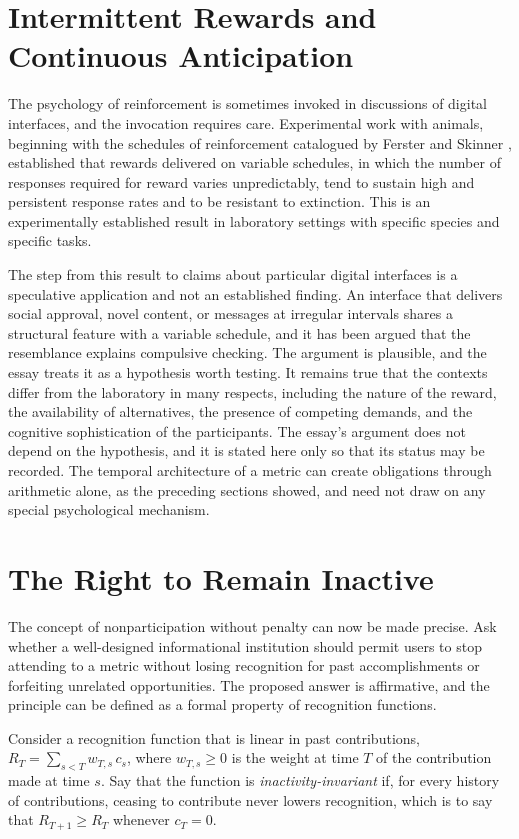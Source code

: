 \documentclass[11pt]{report}
\theoremstyle{definition}
\theoremstyle{remark}
\begin{document}
\section{Intermittent Rewards and Continuous Anticipation}

The psychology of reinforcement is sometimes invoked in discussions of digital interfaces, and the invocation requires care. Experimental work with animals, beginning with the schedules of reinforcement catalogued by Ferster and Skinner \cite{ferster}, established that rewards delivered on variable schedules, in which the number of responses required for reward varies unpredictably, tend to sustain high and persistent response rates and to be resistant to extinction. This is an experimentally established result in laboratory settings with specific species and specific tasks.

The step from this result to claims about particular digital interfaces is a speculative application and not an established finding. An interface that delivers social approval, novel content, or messages at irregular intervals shares a structural feature with a variable schedule, and it has been argued that the resemblance explains compulsive checking. The argument is plausible, and the essay treats it as a hypothesis worth testing. It remains true that the contexts differ from the laboratory in many respects, including the nature of the reward, the availability of alternatives, the presence of competing demands, and the cognitive sophistication of the participants. The essay's argument does not depend on the hypothesis, and it is stated here only so that its status may be recorded. The temporal architecture of a metric can create obligations through arithmetic alone, as the preceding sections showed, and need not draw on any special psychological mechanism.

\section{The Right to Remain Inactive}

The concept of nonparticipation without penalty can now be made precise. Ask whether a well-designed informational institution should permit users to stop attending to a metric without losing recognition for past accomplishments or forfeiting unrelated opportunities. The proposed answer is affirmative, and the principle can be defined as a formal property of recognition functions.

Consider a recognition function that is linear in past contributions, $R_T=\sum_{s<T}w_{T,s}\,c_s$, where $w_{T,s}\ge0$ is the weight at time $T$ of the contribution made at time $s$. Say that the function is \emph{inactivity-invariant} if, for every history of contributions, ceasing to contribute never lowers recognition, which is to say that $R_{T+1}\ge R_T$ whenever $c_T=0$.
\end{document}
